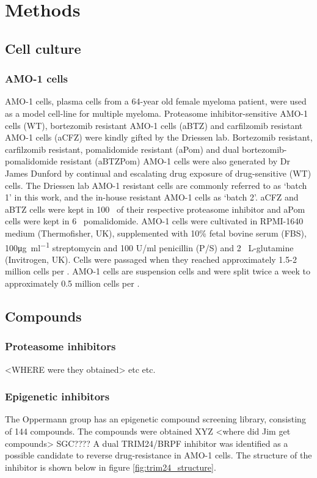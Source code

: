 \chapter{\label{ch:3-methods}Methods}


\section{Cell culture}
\subsection{AMO-1 cells}
AMO-1 cells, plasma cells from a 64-year old female myeloma patient, were used as a model cell-line for multiple myeloma.
Proteasome inhibitor-sensitive AMO-1 cells (WT), bortezomib resistant AMO-1 cells (aBTZ) and carfilzomib resistant AMO-1 cells (aCFZ) were kindly gifted by the Driessen lab\cite{soriano2016proteasome}.
Bortezomib resistant, carfilzomib resistant, pomalidomide resistant (aPom) and dual bortezomib-pomalidomide resistant (aBTZPom) AMO-1 cells were also generated by Dr James Dunford by continual and escalating drug exposure of drug-sensitive (WT) cells.
The Driessen lab AMO-1 resistant cells are commonly referred to as `batch 1' in this work, and the in-house resistant AMO-1 cells as `batch 2'.
aCFZ and aBTZ cells were kept in 100\si{\nano\Molar} of their respective proteasome inhibitor and aPom cells were kept in 6\si{\micro\Molar} pomalidomide.
AMO-1 cells were cultivated in RPMI-1640 medium (Thermofisher, UK), supplemented with 10\% fetal bovine serum (FBS), 100\si{\ug\per\ml} streptomycin and 100 U/ml penicillin (P/S) and 2\si{\milli\Molar} L-glutamine (Invitrogen, UK).
Cells were passaged when they reached approximately 1.5-2 million cells per \ml{}.
AMO-1 cells are suspension cells and were split twice a week to approximately 0.5 million cells per \ml{}.

\section{Compounds}

\subsection{Proteasome inhibitors}
<WHERE were they obtained> etc etc.

\subsection{Epigenetic inhibitors}
The Oppermann group has an epigenetic compound screening library, consisting of 144 compounds.
The compounds were obtained XYZ <where did Jim get compounds> SGC????
A dual TRIM24/BRPF inhibitor was identified as a possible candidate to reverse drug-resistance in AMO-1 cells.
The structure of the inhibitor is shown below in figure \ref{fig:trim24_structure}.


